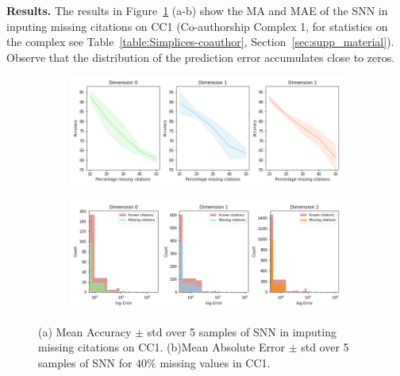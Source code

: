 \textbf{Results.}  The results in Figure~\ref{fig:accuracy-error} (a-b) show the MA and MAE of the SNN in inputing missing citations on CC1 (Co-authorship Complex 1, for statistics on the complex see Table~\ref{table:Simplices-coauthor}, Section~\ref{sec:supp_material}). Observe that the distribution of the prediction error accumulates close to zeros.
\begin{figure}[tb]
\centering
 \begin{subfigure}[t]{-0.8\textwidth}
 \vspace{-4cm}
  \end{subfigure}
\begin{subfigure}[t]{0.8\textwidth}
\centering
   \includegraphics[scale=0.35]{./figures/accuracy_network1.png}
\end{subfigure}
 \begin{subfigure}[t]{0.8\textwidth}
  \end{subfigure}
\begin{subfigure}[t]{0.8\textwidth}
\centering
\vspace{-0.5cm}
   \includegraphics[scale=0.36]{./figures/Error_dist_start150250_seed6666_notsee40.png}
\end{subfigure}
\caption{(a) Mean Accuracy $\pm$ std over 5 samples of SNN in imputing missing citations on CC1. (b)Mean Absolute Error $\pm$ std over 5 samples of SNN for $40\%$ missing values in CC1. }
\label{fig:accuracy-error}
\end{figure}
